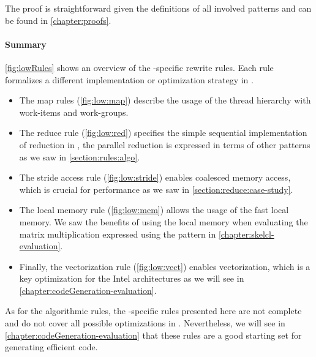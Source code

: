 The proof is straightforward given the definitions of all involved patterns and can be found in \autoref{chapter:proofs}.

\paragraph{Summary}
\autoref{fig:lowRules} shows an overview of the \OpenCL-specific rewrite rules.
Each rule formalizes a different implementation or optimization strategy in \OpenCL.

\begin{itemize}
  \item The map rules (\autoref{fig:low:map}) describe the usage of the \OpenCL thread hierarchy with work-items and work-groups.

  \item The reduce rule (\autoref{fig:low:red}) specifies the simple sequential implementation of reduction in \OpenCL, the parallel reduction is expressed in terms of other patterns as we saw in \autoref{section:rules:algo}.

  \item The stride access rule (\autoref{fig:low:stride}) enables coalesced memory access, which is crucial for performance as we saw in \autoref{section:reduce:case-study}.

  \item The local memory rule (\autoref{fig:low:mem}) allows the usage of the fast local memory.
  We saw the benefits of using the local memory when evaluating the matrix multiplication expressed using the \allpairs pattern in \autoref{chapter:skelcl-evaluation}.

  \item Finally, the vectorization rule (\autoref{fig:low:vect}) enables vectorization, which is a key optimization for the Intel \CPU architectures as we will see in \autoref{chapter:codeGeneration-evaluation}.
\end{itemize}

As for the algorithmic rules, the \OpenCL-specific rules presented here are not complete and do not cover all possible optimizations in \OpenCL.
Nevertheless, we will see in \autoref{chapter:codeGeneration-evaluation} that these rules are a good starting set for generating efficient \OpenCL code.


